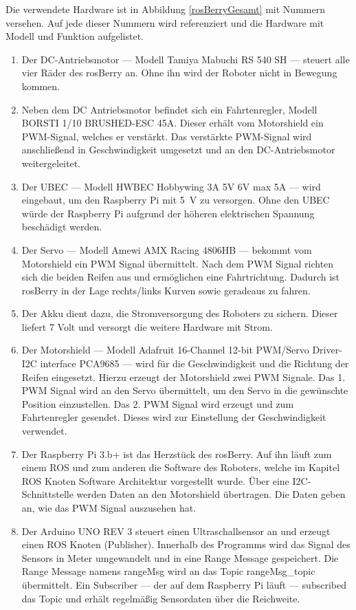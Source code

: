 \documentclass[conference]{IEEEtran}
\begin{document}
Die verwendete Hardware ist in Abbildung \ref{rosBerryGesamt} mit Nummern versehen.
Auf jede dieser Nummern wird referenziert und die Hardware mit Modell und Funktion aufgelistet.

\begin{enumerate}
	\item Der DC-Antriebsmotor — Modell Tamiya Mabuchi RS 540 SH — steuert alle vier Räder des rosBerry an.
	Ohne ihn wird der Roboter nicht in Bewegung kommen.
	\item Neben dem DC Antriebsmotor befindet sich ein Fahrtenregler, Modell BORSTI 1/10 BRUSHED-ESC 45A.
	Dieser erhält vom Motorshield ein PWM-Signal, welches er verstärkt.
	Das verstärkte PWM-Signal wird anschließend in Geschwindigkeit umgesetzt und an den DC-Antriebsmotor weitergeleitet.
	\item Der UBEC — Modell HWBEC Hobbywing 3A 5V 6V max 5A — wird eingebaut, um den Raspberry Pi mit \SI{5}{V} zu versorgen.
	Ohne den UBEC würde der Raspberry Pi aufgrund der höheren elektrischen Spannung beschädigt werden.
	\item Der Servo — Modell Amewi AMX Racing 4806HB — bekommt vom Motorshield ein PWM Signal übermittelt.
	Nach dem PWM Signal richten sich die beiden Reifen aus und ermöglichen eine Fahrtrichtung.
	Dadurch ist rosBerry in der Lage rechts/links Kurven sowie geradeaus zu fahren.
	\item Der Akku dient dazu, die Stromversorgung des Roboters zu sichern.
	Dieser liefert 7 Volt und versorgt die weitere Hardware mit Strom.
	\item Der Motorshield — Modell Adafruit 16-Channel 12-bit PWM/Servo Driver-I2C interface PCA9685 — wird für die Geschwindigkeit und die Richtung der Reifen eingesetzt.
	Hierzu erzeugt der Motorshield zwei PWM Signale.
	Das 1. PWM Signal wird an den Servo übermittelt, um den Servo in die gewünschte Position einzustellen.
	Das 2. PWM Signal wird erzeugt und zum Fahrtenregler gesendet.
	Dieses wird zur Einstellung der Geschwindigkeit verwendet.
	\item Der Raspberry Pi 3.b+ ist das Herzstück des rosBerry.
	Auf ihn läuft zum einem ROS und zum anderen die Software des Roboters, welche im Kapitel ROS Knoten Software Architektur vorgestellt wurde.
	Über eine I2C-Schnittstelle werden Daten an den Motorshield übertragen.
	Die Daten geben an, wie das PWM Signal auszusehen hat.
	\item Der Arduino UNO REV 3 steuert einen Ultraschallsensor an und erzeugt einen ROS Knoten (Publisher).
	Innerhalb des Programms wird das Signal des Sensors in Meter umgewandelt und in eine Range Message gespeichert.
	Die Range Message namens rangeMsg wird an das Topic rangeMsg\_topic übermittelt.
	Ein Subscriber — der auf dem Raspberry Pi läuft — subscribed das Topic und erhält regelmäßig Sensordaten über die Reichweite.
	

\end{enumerate}
\end{document}
